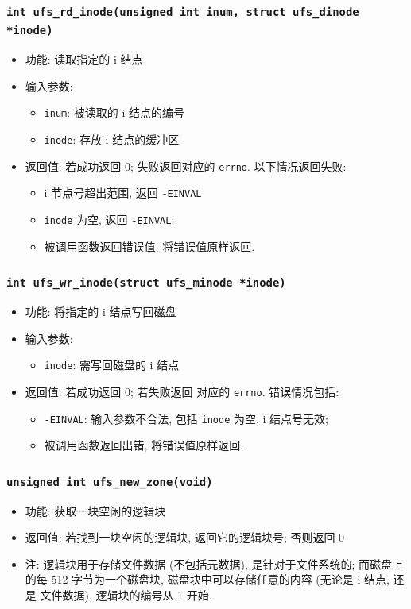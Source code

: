 \documentclass[nofonts]{ctexart}
\begin{document}
\subsubsection{\texttt{int ufs\_rd\_inode(unsigned int inum, struct ufs\_dinode *inode)}}
\begin{itemize}
\item
  功能: 读取指定的 i 结点
\item
  输入参数:

  \begin{itemize}
  \item
    \texttt{inum}: 被读取的 i 结点的编号
  \item
    \texttt{inode}: 存放 i 结点的缓冲区
  \end{itemize}
\item
  返回值: 若成功返回 0; 失败返回对应的 \texttt{errno}. 以下情况返回失败:

  \begin{itemize}
  \item
    i 节点号超出范围, 返回 \texttt{-EINVAL}
  \item
    \texttt{inode} 为空, 返回 \texttt{-EINVAL};
  \item
    被调用函数返回错误值, 将错误值原样返回.
  \end{itemize}
  \end{itemize}
  \subsubsection{\texttt{int ufs\_wr\_inode(struct ufs\_minode *inode)}}
  \begin{itemize}
\item
  功能: 将指定的 i 结点写回磁盘
\item
  输入参数:

  \begin{itemize}
  \item
    \texttt{inode}: 需写回磁盘的 i 结点
  \end{itemize}
\item
  返回值: 若成功返回 0; 若失败返回 对应的 \texttt{errno}. 错误情况包括:

  \begin{itemize}
  \item
    \texttt{-EINVAL}: 输入参数不合法, 包括 \texttt{inode} 为空, i
    结点号无效;
  \item
    被调用函数返回出错, 将错误值原样返回.
  \end{itemize}
  \end{itemize}
  \subsubsection{\texttt{unsigned int ufs\_new\_zone(void)}}
  \begin{itemize}
\item
  功能: 获取一块空闲的逻辑块
\item
  返回值: 若找到一块空闲的逻辑块, 返回它的逻辑块号; 否则返回 0
\item
  注: 逻辑块用于存储文件数据 (不包括元数据), 是针对于文件系统的;
  而磁盘上 的每 512 字节为一个磁盘块, 磁盘块中可以存储任意的内容 (无论是
  i 结点, 还是 文件数据), 逻辑块的编号从 1 开始.
  \end{itemize}
\end{document}

